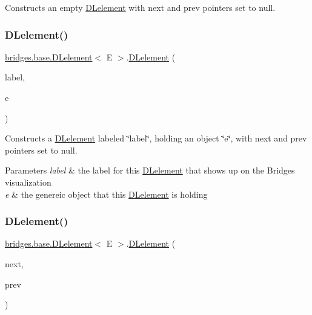 Constructs an empty \hyperlink{classbridges_1_1base_1_1_d_lelement}{D\+Lelement} with next and prev pointers set to null. \hypertarget{classbridges_1_1base_1_1_d_lelement_a6aa1d4a3dad4a196c2ed079d108562bc}{}\label{classbridges_1_1base_1_1_d_lelement_a6aa1d4a3dad4a196c2ed079d108562bc} 
\subsubsection{\texorpdfstring{D\+Lelement()}{DLelement()}\hspace{0.1cm}{\footnotesize\ttfamily [2/4]}}
{\footnotesize\ttfamily \hyperlink{classbridges_1_1base_1_1_d_lelement}{bridges.\+base.\+D\+Lelement}$<$ E $>$.\hyperlink{classbridges_1_1base_1_1_d_lelement}{D\+Lelement} (\begin{DoxyParamCaption}\item[{String}]{label,  }\item[{E}]{e }\end{DoxyParamCaption})}

Constructs a \hyperlink{classbridges_1_1base_1_1_d_lelement}{D\+Lelement} labeled \char`\"{}label\char`\"{}, holding an object \char`\"{}e\char`\"{}, with next and prev pointers set to null. 
\begin{DoxyParams}{Parameters}
{\em label} & the label for this \hyperlink{classbridges_1_1base_1_1_d_lelement}{D\+Lelement} that shows up on the Bridges visualization \\
\hline
{\em e} & the genereic object that this \hyperlink{classbridges_1_1base_1_1_d_lelement}{D\+Lelement} is holding \\
\hline
\end{DoxyParams}
\hypertarget{classbridges_1_1base_1_1_d_lelement_ab1e4eace66bb1b097463c4f04e964cd0}{}\label{classbridges_1_1base_1_1_d_lelement_ab1e4eace66bb1b097463c4f04e964cd0} 
\subsubsection{\texorpdfstring{D\+Lelement()}{DLelement()}\hspace{0.1cm}{\footnotesize\ttfamily [3/4]}}
{\footnotesize\ttfamily \hyperlink{classbridges_1_1base_1_1_d_lelement}{bridges.\+base.\+D\+Lelement}$<$ E $>$.\hyperlink{classbridges_1_1base_1_1_d_lelement}{D\+Lelement} (\begin{DoxyParamCaption}\item[{\hyperlink{classbridges_1_1base_1_1_d_lelement}{D\+Lelement}$<$ E $>$}]{next,  }\item[{\hyperlink{classbridges_1_1base_1_1_d_lelement}{D\+Lelement}$<$ E $>$}]{prev }\end{DoxyParamCaption})}

